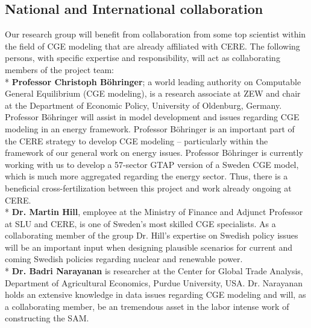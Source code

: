\subsection{National and International collaboration}
Our research group will benefit from collaboration from some top scientist within the field of CGE modeling that are already affiliated with CERE. The following persons, with specific expertise and responsibility, will act as collaborating members of the project team:\\*
\textbf{Professor Christoph Böhringer}; a world leading authority on Computable General Equilibrium (CGE modeling), is a research associate at ZEW and chair at the Department of Economic Policy, University of Oldenburg, Germany. Professor Böhringer will assist in model development and issues regarding CGE modeling in an energy framework. Professor Böhringer is an important part of the CERE strategy to develop CGE modeling – particularly within the framework of our general work on energy issues. Professor Böhringer is currently working with us to develop a 57-sector GTAP version of a Sweden CGE model, which is much more aggregated regarding the energy sector. Thus, there is a beneficial cross-fertilization between this project and work already ongoing at CERE.\\*
\textbf{Dr. Martin Hill}, employee at the Ministry of Finance and Adjunct Professor at SLU and CERE, is one of Sweden's most skilled CGE specialists. As a collaborating member of the group Dr. Hill’s expertise on Swedish policy issues will be an important input when designing plausible scenarios for current and coming Swedish policies regarding nuclear and renewable power.\\*
\textbf{Dr. Badri Narayanan} is researcher at the Center for Global Trade Analysis, Department of Agricultural Economics, Purdue University, USA. Dr. Narayanan holds an extensive knowledge in data issues regarding CGE modeling and will, as a collaborating member, be an tremendous asset in the labor intense work of constructing the SAM.

